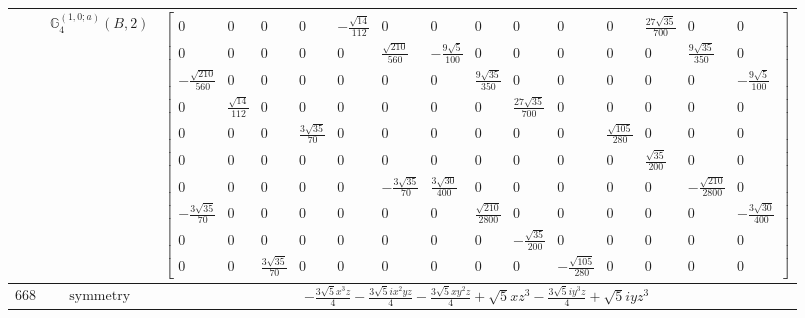 \documentclass[fleqn,8pt,landscape]{jsarticle}
\begin{document}
\begin{longtable}{ccc}
$  $ & $ \mathbb{G}_{4}^{(1,0;a)}(B,2) $ & $ \begin{bmatrix} 0 & 0 & 0 & 0 & - \frac{\sqrt{14}}{112} & 0 & 0 & 0 & 0 & 0 & 0 & \frac{27 \sqrt{35}}{700} & 0 & 0 \\ 0 & 0 & 0 & 0 & 0 & \frac{\sqrt{210}}{560} & - \frac{9 \sqrt{5}}{100} & 0 & 0 & 0 & 0 & 0 & \frac{9 \sqrt{35}}{350} & 0 \\ - \frac{\sqrt{210}}{560} & 0 & 0 & 0 & 0 & 0 & 0 & \frac{9 \sqrt{35}}{350} & 0 & 0 & 0 & 0 & 0 & - \frac{9 \sqrt{5}}{100} \\ 0 & \frac{\sqrt{14}}{112} & 0 & 0 & 0 & 0 & 0 & 0 & \frac{27 \sqrt{35}}{700} & 0 & 0 & 0 & 0 & 0 \\ 0 & 0 & 0 & \frac{3 \sqrt{35}}{70} & 0 & 0 & 0 & 0 & 0 & 0 & \frac{\sqrt{105}}{280} & 0 & 0 & 0 \\ 0 & 0 & 0 & 0 & 0 & 0 & 0 & 0 & 0 & 0 & 0 & \frac{\sqrt{35}}{200} & 0 & 0 \\ 0 & 0 & 0 & 0 & 0 & - \frac{3 \sqrt{35}}{70} & \frac{3 \sqrt{30}}{400} & 0 & 0 & 0 & 0 & 0 & - \frac{\sqrt{210}}{2800} & 0 \\ - \frac{3 \sqrt{35}}{70} & 0 & 0 & 0 & 0 & 0 & 0 & \frac{\sqrt{210}}{2800} & 0 & 0 & 0 & 0 & 0 & - \frac{3 \sqrt{30}}{400} \\ 0 & 0 & 0 & 0 & 0 & 0 & 0 & 0 & - \frac{\sqrt{35}}{200} & 0 & 0 & 0 & 0 & 0 \\ 0 & 0 & \frac{3 \sqrt{35}}{70} & 0 & 0 & 0 & 0 & 0 & 0 & - \frac{\sqrt{105}}{280} & 0 & 0 & 0 & 0 \end{bmatrix} $ \\ \hline
$ 668 $ & $ \text{symmetry} $ & $ - \frac{3 \sqrt{5} x^{3} z}{4} - \frac{3 \sqrt{5} i x^{2} y z}{4} - \frac{3 \sqrt{5} x y^{2} z}{4} + \sqrt{5} x z^{3} - \frac{3 \sqrt{5} i y^{3} z}{4} + \sqrt{5} i y z^{3} $ \\

\end{longtable}
\end{document}

